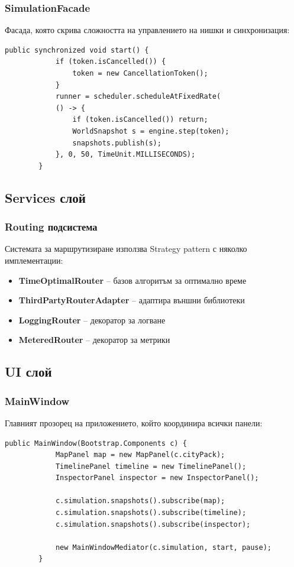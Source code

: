 \documentclass{article}
\begin{document}
	\subsubsection{SimulationFacade}
	
	Фасада, която скрива сложността на управлението на нишки и синхронизация:
	
	\begin{lstlisting}[caption=SimulationFacade управление]
		public synchronized void start() {
			if (token.isCancelled()) {
				token = new CancellationToken();
			}
			runner = scheduler.scheduleAtFixedRate(
			() -> {
				if (token.isCancelled()) return;
				WorldSnapshot s = engine.step(token);
				snapshots.publish(s);
			}, 0, 50, TimeUnit.MILLISECONDS);
		}
	\end{lstlisting}
	
	\subsection{Services слой}
	
	\subsubsection{Routing подсистема}
	
	Системата за маршрутизиране използва Strategy pattern с няколко имплементации:
	
	\begin{itemize}
		\item \textbf{TimeOptimalRouter} – базов алгоритъм за оптимално време
		\item \textbf{ThirdPartyRouterAdapter} – адаптира външни библиотеки
		\item \textbf{LoggingRouter} – декоратор за логване
		\item \textbf{MeteredRouter} – декоратор за метрики
	\end{itemize}
	
	\subsection{UI слой}
	
	\subsubsection{MainWindow}
	
	Главният прозорец на приложението, който координира всички панели:
	
	\begin{lstlisting}[caption=Структура на MainWindow]
		public MainWindow(Bootstrap.Components c) {
			MapPanel map = new MapPanel(c.cityPack);
			TimelinePanel timeline = new TimelinePanel();
			InspectorPanel inspector = new InspectorPanel();
			
			c.simulation.snapshots().subscribe(map);
			c.simulation.snapshots().subscribe(timeline);
			c.simulation.snapshots().subscribe(inspector);
			
			new MainWindowMediator(c.simulation, start, pause);
		}
	\end{lstlisting}
	
\end{document}
